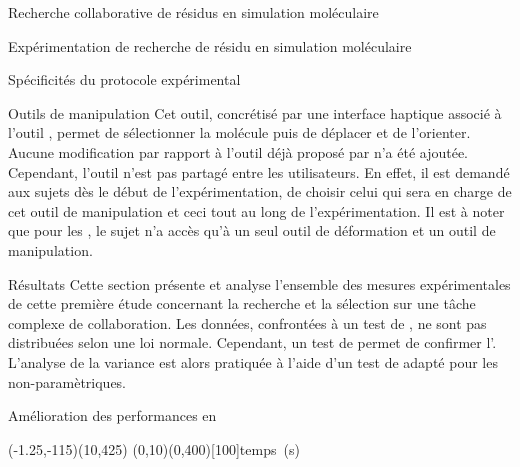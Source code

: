 \documentclass[myfrancais]{mythesis}
\begin{document}
\begin{mychapter}{Recherche collaborative de résidus en simulation moléculaire}
\begin{mysection}{Expérimentation de recherche de résidu en simulation moléculaire}
\begin{mysubsection}{Spécificités du protocole expérimental}
\begin{mysubsubsection}{Outils de manipulation}
					Cet outil, concrétisé par une interface haptique associé à l'outil , permet de sélectionner la molécule puis de déplacer et de l'orienter.
					Aucune modification par rapport à l'outil déjà proposé par  n'a été ajoutée.
					Cependant, l'outil n'est pas partagé entre les utilisateurs.
					En effet, il est demandé aux sujets dès le début de l'expérimentation, de choisir celui qui sera en charge de cet outil de manipulation et ceci tout au long de l'expérimentation.
					Il est à noter que pour les , le sujet n'a accès qu'à un seul outil de déformation et un outil de manipulation.
				\end{mysubsubsection}
			\end{mysubsection}
		\end{mysection}
		\begin{mysection}{Résultats}
			Cette section présente et analyse l'ensemble des mesures expérimentales de cette première étude concernant la recherche et la sélection sur une tâche complexe de collaboration.
			Les données, confrontées à un test de , ne sont pas distribuées selon une loi normale.
			Cependant, un test de  permet de confirmer l'.
			L'analyse de la variance est alors pratiquée à l'aide d'un test de  adapté pour les  non-paramètriques.
			\begin{mysubsection}{Amélioration des performances en }
				\begin{myfigure}
					\begin{myps}(-1.25,-115)(10,425)
						\myaxes(0,10){}(0,400)[100]{temps~(s)}
					\end{myps}
				\end{myfigure}


\end{mysubsection}
\end{mysection}
\end{mychapter}
\end{document}
